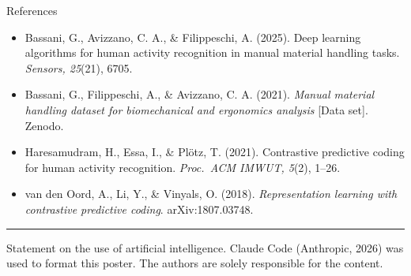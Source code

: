 \documentclass[10pt]{article}
\newcommand{\serif}{\fontfamily{bch}\selectfont}
\newcommand{\seccion}[1]{%
  \begin{tcolorbox}[colback=olive,colframe=olive,arc=0pt,
    boxrule=0pt,left=8pt,top=3pt,bottom=4pt,width=\linewidth]
    {\serif\color{white}\fontsize{30}{36}\selectfont #1}
  \end{tcolorbox}\vspace{-0.3em}}
\newlength{\colh}
\begin{document}
\begin{minipage}[t][\colh][s]{0.30\linewidth}
\vfill
\seccion{References}
{\fontsize{18}{23}\selectfont
\begin{itemize}[leftmargin=1.2em,itemsep=0.2em]
  \item Bassani, G., Avizzano, C. A., \& Filippeschi, A. (2025). Deep learning algorithms for human activity recognition in manual material handling tasks. \emph{Sensors, 25}(21), 6705.
  \item Bassani, G., Filippeschi, A., \& Avizzano, C. A. (2021). \emph{Manual material handling dataset for biomechanical and ergonomics analysis} [Data set]. Zenodo.
  \item Haresamudram, H., Essa, I., \& Plötz, T. (2021). Contrastive predictive coding for human activity recognition. \emph{Proc.\ ACM IMWUT, 5}(2), 1--26.
  \item van den Oord, A., Li, Y., \& Vinyals, O. (2018). \emph{Representation learning with contrastive predictive coding}. arXiv:1807.03748.
\end{itemize}}

\end{minipage}

\vfill
{\color{olive}\rule{\linewidth}{2.5pt}}
\vspace{0.3cm}

\noindent
{\fontsize{18}{23}\selectfont\color{ink}
{\serif\color{olivedark}\fontsize{22}{28}\selectfont Statement on the use of artificial intelligence.}
Claude Code (Anthropic, 2026) was used to format this poster.
The authors are solely responsible for the content.\par}
\end{document}
